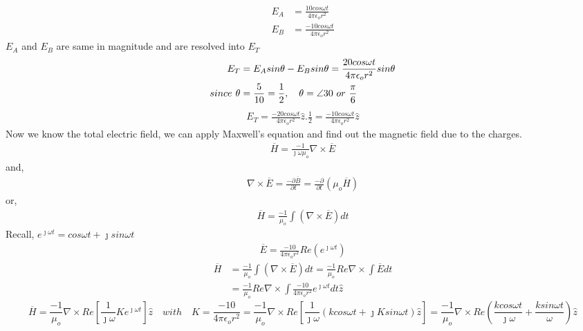 \begin{exmp}
\begin{align*}
E_A &= \frac{10cos\omega t}{4\pi\epsilon_or^2}\\
E_B &= \frac{-10cos\omega t}{4\pi\epsilon_o r^2}
\end{align*}
$E_A$ and $E_B$ are same in magnitude and are resolved into $E_T$
\begin{align*}
E_T &= E_Asin\theta - E_Bsin\theta = \frac{20cos\omega t}{4\pi\epsilon_o r^2}sin\theta \\
since \hspace{0.05in} \theta &= \frac{5}{10} = \frac{1}{2}, \quad \theta = \angle {30} \ or \ \frac{\pi}{6}
\end{align*}
\begin{align*}
E_T = \frac{-20cos\omega t}{4\pi\epsilon_o r^2}\hat{z}.\frac{1}{2} = \frac{-10cos\omega t}{4\pi\epsilon_o r^2}\hat{z}
\end{align*}
Now we know the total electric field, we can apply Maxwell's equation and find out the magnetic field due to the charges.
\begin{align*}
\overline{H} = \frac{-1}{\jmath\omega\mu_o}\nabla\times\overline{E}
\end{align*}
and,
\begin{align*}
\nabla\times\overline{E} = \frac{-\partial\overline{B}}{\partial t} = \frac{-\partial}{\partial t}(\mu_o\overline{H})
\end{align*}
or,
\begin{align*}
\overline{H} = \frac{-1}{\mu_o}\int(\nabla\times\overline{E})dt
\end{align*}
Recall, $ e^{\jmath\omega t} = cos\omega t + \jmath sin\omega t $
\begin{align*}
\overline{E} = \frac{-10}{4\pi\epsilon_o r^2}Re(e^{\jmath\omega t})
\end{align*}
\begin{align*}
\overline{H} &= \frac{-1}{\mu_o}\int(\nabla\times\overline{E})dt = \frac{-1}{\mu_o}Re\nabla\times\int\overline{E}dt\\
&= \frac{-1}{\mu_o}Re\nabla\times\int\frac{-10}{4\pi\epsilon_o r^2}e^{\jmath\omega t}dt\hat{z}
\end{align*}
\begin{dmath*}
\overline{H} = \frac{-1}{\mu_o}\nabla\times Re\left[\frac{1}{\jmath\omega}Ke^{\jmath\omega t} \right]\hat{z}\quad with\quad K =\frac{-10}{4\pi\epsilon_o r^2}
=\frac{-1}{\mu_o}\nabla\times Re\left[\frac{1}{\jmath\omega}(kcos\omega t + \jmath Ksin\omega t)\hat{z} \right]
= \frac{-1}{\mu_o}\nabla\times Re\left(\frac{kcos\omega t}{\jmath\omega} + \frac{ksin\omega t}{\omega} \right)\hat{z}

\end{dmath*}
\end{exmp}
